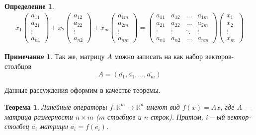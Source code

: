 \documentclass[]{article}
\theoremstyle{theorem}
\newtheorem{thr}{Теорема}
\newtheorem{dfn}{Определение}
\theoremstyle{definition}
\newtheorem*{nt}{Примечание}
\begin{document}
\begin{dfn}
		\begin{gather*}
		x_1
	\begin{pmatrix}
		a_{11}
		\\
		a_{21}
		\\
		\vdots
		\\
		a_{n1}
	\end{pmatrix}
	+
	x_2
	\begin{pmatrix}
		a_{12}
		\\
		a_{22}
		\\
		\vdots
		\\
		a_{n2}
	\end{pmatrix}
	+
	x_m
	\begin{pmatrix}
		a_{1m}
		\\
		a_{2m}
		\\
		\vdots
		\\
		a_{nm}
	\end{pmatrix}
	=
	\begin{pmatrix}
		a_{11} & a_{12} & \ldots & a_{1m}
		\\
		a_{21} & a_{22} & \ldots & a_{2m}
		\\
		\vdots & \vdots & \ddots & \vdots
		\\
		a_{n1} & a_{n2} & \ldots & a_{nm}
	\end{pmatrix}
	\begin{pmatrix}
		x_{1}
		\\
		x_{2}
		\\
		\vdots
		\\
		x_{m}
	\end{pmatrix}
\end{gather*}
\end{dfn}



\begin{nt}
	Так же, матрицу $A$ можно записать на как набор векторов-столбцов
\begin{equation*}
	A=(\overline{a_1},\overline{a_1},\ldots,\overline{a_m})
\end{equation*}
\end{nt}

Данные рассуждения оформим в качестве теоремы.
\begin{thr}\label{th1}
	Линейные операторы $f:\mathbb{R}^m\rightarrow\mathbb{R}^n$ имеют вид $f(x)=Ax$, где $A$ --- матрица размерности $n\times m$ ($m$ столбцов и $n$ строк). Притом, $i-$ый вектор-столбец $\overline{a_i}$ матрицы $\overline{a_i}=f(\overline{e_i})$.
\end{thr}
\end{document}
